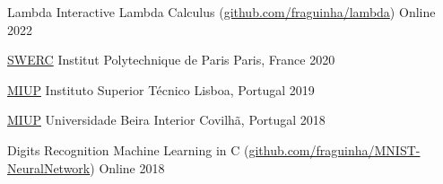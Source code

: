 




\begin{cvhonors}

\cvhonor
  {Lambda} %
  {Interactive Lambda Calculus (\href{https://github.com/fraguinha/lambda}{github.com/fraguinha/lambda})} %
  {Online} %
  {2022} %

\end{cvhonors}




\begin{cvhonors}

\cvhonor
  {\href{https://swerc.eu/2020/about/}{SWERC}} %
  {Institut Polytechnique de Paris} %
  {Paris, France} %
  {2020} %

\cvhonor
  {\href{https://miup19.tecnico.ulisboa.pt/}{MIUP}} %
  {Instituto Superior Técnico} %
  {Lisboa, Portugal} %
  {2019} %

\cvhonor
  {\href{https://miup.ubi.pt}{MIUP}} %
  {Universidade Beira Interior} %
  {Covilhã, Portugal} %
  {2018} %

\end{cvhonors}




\begin{cvhonors}


\cvhonor
  {Digits Recognition} %
  {Machine Learning in C (\href{https://github.com/fraguinha/MNIST-NeuralNetwork}{github.com/fraguinha/MNIST-NeuralNetwork})} %
  {Online} %
  {2018} %

\end{cvhonors}
